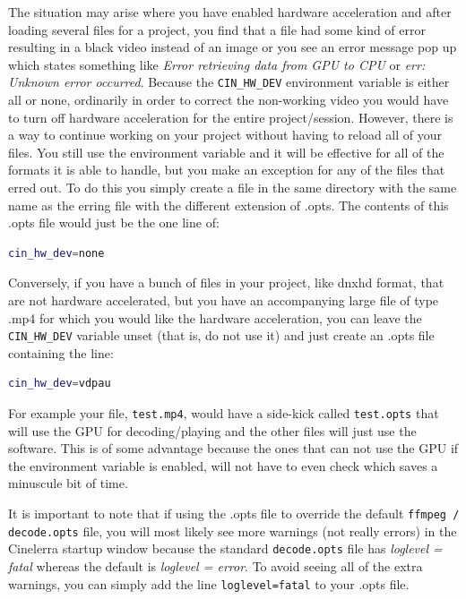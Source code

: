 The situation may arise where you have enabled hardware acceleration and after loading several files for a project, you find that a file had some kind of error resulting in a black video instead of an image or you see an error message pop up which states something like \textit{Error retrieving data from GPU to CPU} or \textit{err: Unknown error occurred}. Because the \texttt{CIN\_HW\_DEV} environment variable is either all or none, ordinarily in order to correct the non-working video you would have to turn off hardware acceleration for the entire project/session.  However, there is a way to continue working on your project without having to reload all of your files. You still use the environment variable and it will be effective for all of the formats it is able to handle, but you make an exception for any of the files that erred out. To do this you simply create a file in the same directory with the same name as the erring file with the different extension of .opts. The contents of this .opts file would just be the one line of:

\begin{lstlisting}[language=bash,numbers=none]
cin_hw_dev=none
\end{lstlisting}

Conversely, if you have a bunch of files in your project, like dnxhd format, that are not hardware accelerated, but you have an accompanying large file of type .mp4 for which you would like the hardware acceleration, you can leave the \texttt{CIN\_HW\_DEV} variable unset (that is, do not use it) and just create an .opts file containing the line:

\begin{lstlisting}[language=bash,numbers=none]
cin_hw_dev=vdpau
\end{lstlisting}

For example your file, \texttt{test.mp4}, would have a side-kick called \texttt{test.opts} that will use the GPU for decoding/playing and the other files will just use the software. This is of some advantage because the ones that can not use the GPU if the environment variable is enabled, will not have to even check which saves a minuscule bit of time.

It is important to note that if using the .opts file to override the default \texttt{ffmpeg / decode.opts} file, you will most likely see more warnings (not really errors) in the Cinelerra startup window because the standard \texttt{decode.opts} file has \textit{loglevel = fatal} whereas the default is \textit{loglevel = error}.  To avoid seeing all of the extra warnings, you can simply add the line   \texttt{loglevel=fatal}   to your .opts file.

